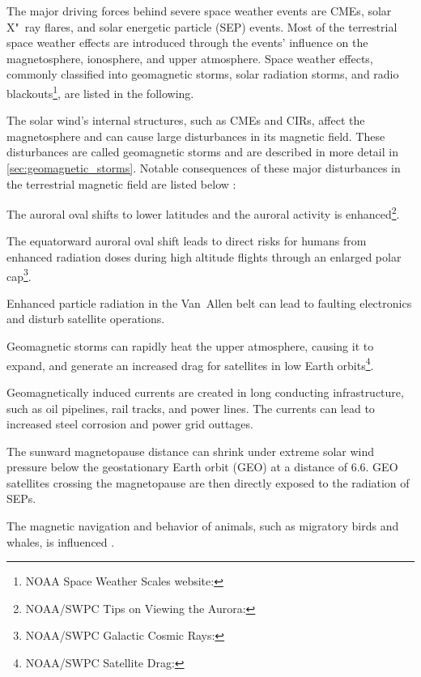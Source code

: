 The major driving forces behind severe space weather events are CMEs, solar X"~ray flares, and solar energetic particle (SEP) events. Most of the terrestrial space weather effects are introduced through the events' influence on the magnetosphere, ionosphere, and upper atmosphere. Space weather effects, commonly classified into geomagnetic storms, solar radiation storms, and radio blackouts\footnote{NOAA Space Weather Scales website: }, are listed in the following.

The solar wind's internal structures, such as CMEs and CIRs, affect the magnetosphere and can cause large disturbances in its magnetic field. These disturbances are called geomagnetic storms and are described in more detail in \autoref{sec:geomagnetic_storms}. Notable consequences of these major disturbances in the terrestrial magnetic field are listed below \citep{Bothmer2007}:
\begin{itemize*}
	\item The auroral oval shifts to lower latitudes and the auroral activity is enhanced\footnote{NOAA/SWPC Tips on Viewing the Aurora: }.
	\item The equatorward auroral oval shift leads to direct risks for humans from enhanced radiation doses during high altitude flights through an enlarged polar cap\footnote{NOAA/SWPC Galactic Cosmic Rays: }.
	\item Enhanced particle radiation in the Van~Allen belt can lead to faulting electronics and disturb satellite operations.
	\item Geomagnetic storms can rapidly heat the upper atmosphere, causing it to expand, and generate an increased drag for satellites in low Earth orbits\footnote{NOAA/SWPC Satellite Drag: }.
	\item Geomagnetically induced currents are created in long conducting infrastructure, such as oil pipelines, rail tracks, and power lines. The currents can lead to increased steel corrosion and power grid outtages.
	\item The sunward magnetopause distance can shrink under extreme solar wind pressure below the geostationary Earth orbit (GEO) at a distance of \SI{6.6}{\RE}. GEO satellites crossing the magnetopause are then directly exposed to the radiation of SEPs.
	\item The magnetic navigation and behavior of animals, such as migratory birds \citep{Moore1977} and whales, is influenced \citep{Vanselow2017}.
\end{itemize*}

